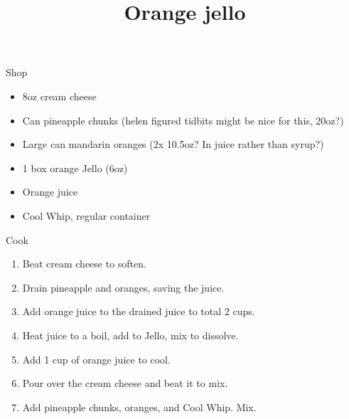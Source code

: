\documentclass{article}
\title{Orange jello}
\date{\vspace{-5ex}}
\begin{document}
\maketitle

Shop

\begin{itemize}
	\item 8oz cream cheese
	\item Can pineapple chunks (helen figured tidbits might be nice for this, 20oz?)
	\item Large can mandarin oranges (2x 10.5oz? In juice rather than syrup?)
	\item 1 box orange Jello (6oz)
	\item Orange juice
	\item Cool Whip, regular container
\end{itemize}

Cook

\begin{enumerate}

	\item Beat cream cheese to soften.
	\item Drain pineapple and oranges, saving the juice.
	\item Add orange juice to the drained juice to total 2 cups.
	\item Heat juice to a boil, add to Jello, mix to dissolve.
	\item Add 1 cup of orange juice to cool.
	\item Pour over the cream cheese and beat it to mix.
	\item Add pineapple chunks, oranges, and Cool Whip. Mix.
\end{enumerate}
\end{document}
